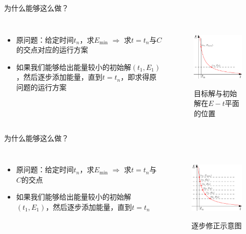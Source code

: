 \documentclass{beamer}
\begin{document}
\begin{frame}{为什么能够这么做？}
    \begin{columns}[c]
        \column{8cm}
            \begin{itemize}
              \item 原问题：给定时间$t_n$，求$E_{\min}$ $\Longrightarrow$ 求$t = t_n$与$C$的交点对应的运行方案
              \item 如果我们能够给出能量较小的初始解$(t_1,E_1)$，然后逐步添加能量，直到$t = t_n$，即求得原问题的运行方案
            \end{itemize}
        \column{5cm}
            \begin{figure}
              \centering
              \includegraphics[width=4.5cm]{fig/fig2/fig2.pdf}\\
              \caption{目标解与初始解在$E-t$平面的位置}
            \end{figure}

    \end{columns}
\end{frame}

\begin{frame}{为什么能够这么做？}
    \begin{columns}[c]
        \column{8cm}
            \begin{itemize}
              \item 原问题：给定时间$t_n$，求$E_{\min}$ $\Longrightarrow$ 求$t = t_n$与$C$的交点
              \item 如果我们能够给出能量较小的初始解$(t_1,E_1)$，然后逐步添加能量，直到$t = t_n$
            \end{itemize}
        \column{5cm}
        \begin{figure}
          \centering
          \includegraphics[width=4.5cm]{fig/fig3/fig3.pdf}\\
          \caption{逐步修正示意图}
        \end{figure}


    \end{columns}
\end{frame}
\end{document}
